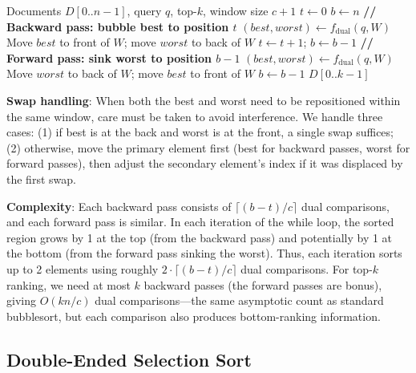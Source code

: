 \begin{algorithm}[!htbp]
\caption{Cocktail Shaker Sort for Dual-End Setwise}
\label{alg:cocktail}
\scriptsize
\begin{algorithmic}[1]
\REQUIRE Documents $D[0..n{-}1]$, query $q$, top-$k$, window size $c{+}1$
\STATE $t \leftarrow 0$ 
\STATE $b \leftarrow n$ 
    \STATE \textbf{// Backward pass: bubble best to position $t$}
        \STATE $(best, worst) \leftarrow f_{\text{dual}}(q, W)$
        \STATE Move $best$ to front of $W$; move $worst$ to back of $W$
    \ENDFOR
    \STATE $t \leftarrow t + 1$; $b \leftarrow b - 1$
        \STATE \textbf{// Forward pass: sink worst to position $b{-}1$}
            \STATE $(best, worst) \leftarrow f_{\text{dual}}(q, W)$
            \STATE Move $worst$ to back of $W$; move $best$ to front of $W$
        \ENDFOR
        \STATE $b \leftarrow b - 1$
    \ENDIF
\ENDWHILE
\RETURN $D[0..k{-}1]$
\end{algorithmic}
\end{algorithm}

\textbf{Swap handling}: When both the best and worst need to be repositioned within the same window, care must be taken to avoid interference. We handle three cases: (1) if best is at the back and worst is at the front, a single swap suffices; (2) otherwise, move the primary element first (best for backward passes, worst for forward passes), then adjust the secondary element's index if it was displaced by the first swap.

\textbf{Complexity}: Each backward pass consists of $\lceil(b-t)/c\rceil$ dual comparisons, and each forward pass is similar. In each iteration of the while loop, the sorted region grows by 1 at the top (from the backward pass) and potentially by 1 at the bottom (from the forward pass sinking the worst). Thus, each iteration sorts up to 2 elements using roughly $2 \cdot \lceil(b-t)/c\rceil$ dual comparisons. For top-$k$ ranking, we need at most $k$ backward passes (the forward passes are bonus), giving $O(kn/c)$ dual comparisons---the same asymptotic count as standard bubblesort, but each comparison also produces bottom-ranking information.


\subsection{Double-Ended Selection Sort}

